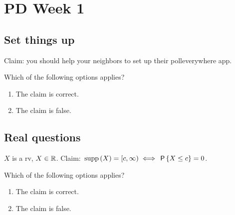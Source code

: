 \documentclass[poll_tutorial_format]{subfiles}
\begin{document}
\maketitle
\setcounter{section}{6}
\section{PD Week 1}

\subsection{Set things up}
\label{sec:set-things-up}



\setcounter{theorem}{-1}
\begin{exercise}
Claim: you should help your neighbors to set up their polleverywhere app.

\vspace{0.5cm}\noindent  Which of the following options applies?
\begin{enumerate}
\item The claim is correct.
\item The claim is false.
\end{enumerate}
\end{exercise}

\subsection{Real questions}
\label{sec:start-real-questions pt week 5}

\begin{exercise}
$X$ is a rv, $X  \in \mathbb{R}$. Claim: $\,\mathrm{supp}\left(X\right) = [c, \infty) \iff \,\mathsf{P}\left\{X\leq c\right\} = 0$.

\vspace{0.5cm}\noindent  Which of the following options applies?
\begin{enumerate}
\item The claim is correct.
\item The claim is false.
\end{enumerate}
\end{exercise}
\end{document}
